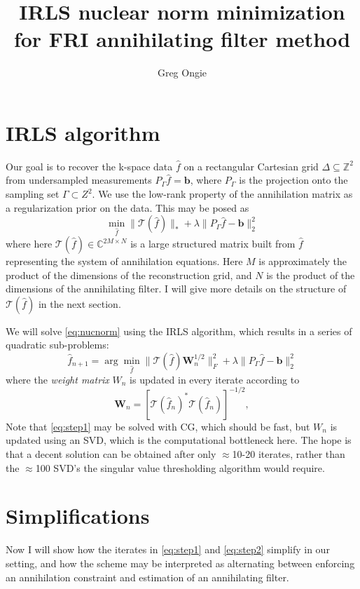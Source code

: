 \documentclass[a4paper]{article}
\title{IRLS nuclear norm minimization for FRI annihilating filter method}
\author{Greg Ongie}
\begin{document}
\maketitle

\section{IRLS algorithm}
Our goal is to recover the k-space data $\hat f$ on a rectangular Cartesian grid $\Delta \subseteq \mathbb{Z}^2$ from undersampled measurements $P_\Gamma \hat f = \mathbf b$, where $P_\Gamma$ is the projection onto the sampling set $\Gamma \subset{Z}^2$. We use the low-rank property of the annihilation matrix as a regularization prior on the data. This may be posed as
\begin{equation}
\label{eq:nucnorm}
\min_{\widehat{f}} \|\mathcal{T}(\hat f)\|_* + \lambda \|P_\Gamma \hat f - \mathbf b\|^2_2
\end{equation}
where here $\mathcal{T}(\hat f)\in \mathbb{C}^{2M\times N}$ is a large structured matrix built from $\hat f$ representing the system of annihilation equations. Here $M$ is approximately the product of the dimensions of the reconstruction grid, and $N$ is the product of the dimensions of the annihilating filter. I will give more details on the structure of $\mathcal{T}(\hat f)$ in the next section.

We will solve \eqref{eq:nucnorm} using the IRLS algorithm, which results in a series of quadratic sub-problems: 
\begin{equation}
\label{eq:step1}
\hat f_{n+1} = \arg\min_{\hat f} \|\mathcal{T}(\hat f) \mathbf W_n^{1/2} \|_F^2 + \lambda \|P_\Gamma \hat f - \mathbf b\|^2_2
\end{equation}
where the \emph{weight matrix} $W_n$ is updated in every iterate according to
\begin{equation}
\label{eq:step2}
\mathbf W_n = [\mathcal{T}(\hat f_n)^* \mathcal{T}(\hat f_n)]^{-1/2},
\end{equation}
Note that \eqref{eq:step1} may be solved with CG, which should be fast, but $W_n$ is updated using an SVD, which is the computational bottleneck here. The hope is that a decent solution can be obtained after only $\approx$10-20 iterates, rather than the $\approx$100 SVD's the singular value thresholding algorithm would require.

\section{Simplifications}
Now I will show how the iterates in \eqref{eq:step1} and \eqref{eq:step2} simplify in our setting, and how the scheme may be interpreted as alternating between enforcing an annihilation constraint and estimation of an annihilating filter.
\end{document}
